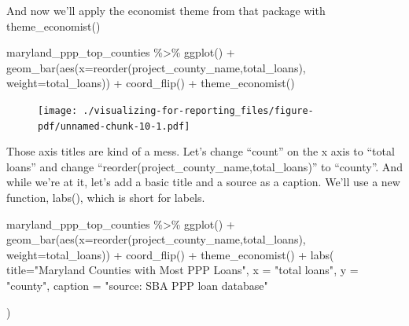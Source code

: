 \documentclass[
  letterpaper,
  DIV=11,
  numbers=noendperiod]{scrreprt}
\newenvironment{Shaded}{\begin{snugshade}}{\end{snugshade}}
\newcommand{\AttributeTok}[1]{\textcolor[rgb]{0.40,0.45,0.13}{#1}}
\newcommand{\FunctionTok}[1]{\textcolor[rgb]{0.28,0.35,0.67}{#1}}
\newcommand{\NormalTok}[1]{\textcolor[rgb]{0.00,0.23,0.31}{#1}}
\newcommand{\SpecialCharTok}[1]{\textcolor[rgb]{0.37,0.37,0.37}{#1}}
\newcommand{\StringTok}[1]{\textcolor[rgb]{0.13,0.47,0.30}{#1}}
\begin{document}
And now we'll apply the economist theme from that package with
theme\_economist()

\begin{Shaded}
\begin{Highlighting}[]
\NormalTok{maryland\_ppp\_top\_counties }\SpecialCharTok{\%\textgreater{}\%}
  \FunctionTok{ggplot}\NormalTok{() }\SpecialCharTok{+}
  \FunctionTok{geom\_bar}\NormalTok{(}\FunctionTok{aes}\NormalTok{(}\AttributeTok{x=}\FunctionTok{reorder}\NormalTok{(project\_county\_name,total\_loans), }\AttributeTok{weight=}\NormalTok{total\_loans)) }\SpecialCharTok{+}
  \FunctionTok{coord\_flip}\NormalTok{() }\SpecialCharTok{+}
  \FunctionTok{theme\_economist}\NormalTok{()}
\end{Highlighting}
\end{Shaded}

\begin{figure}[H]

{\centering \texttt{[image: ./visualizing-for-reporting\_files/figure-pdf/unnamed-chunk-10-1.pdf]}

}

\end{figure}

Those axis titles are kind of a mess. Let's change ``count'' on the x
axis to ``total loans'' and change
``reorder(project\_county\_name,total\_loans)'' to ``county''. And while
we're at it, let's add a basic title and a source as a caption. We'll
use a new function, labs(), which is short for labels.

\begin{Shaded}
\begin{Highlighting}[]
\NormalTok{maryland\_ppp\_top\_counties }\SpecialCharTok{\%\textgreater{}\%}
  \FunctionTok{ggplot}\NormalTok{() }\SpecialCharTok{+}
  \FunctionTok{geom\_bar}\NormalTok{(}\FunctionTok{aes}\NormalTok{(}\AttributeTok{x=}\FunctionTok{reorder}\NormalTok{(project\_county\_name,total\_loans), }\AttributeTok{weight=}\NormalTok{total\_loans)) }\SpecialCharTok{+}
  \FunctionTok{coord\_flip}\NormalTok{() }\SpecialCharTok{+}
  \FunctionTok{theme\_economist}\NormalTok{() }\SpecialCharTok{+}
  \FunctionTok{labs}\NormalTok{(}
    \AttributeTok{title=}\StringTok{"Maryland Counties with Most PPP Loans"}\NormalTok{,}
    \AttributeTok{x =} \StringTok{"total loans"}\NormalTok{,}
    \AttributeTok{y =} \StringTok{"county"}\NormalTok{,}
    \AttributeTok{caption =} \StringTok{"source: SBA PPP loan database"}

\NormalTok{  )}
\end{Highlighting}
\end{Shaded}
\end{document}
